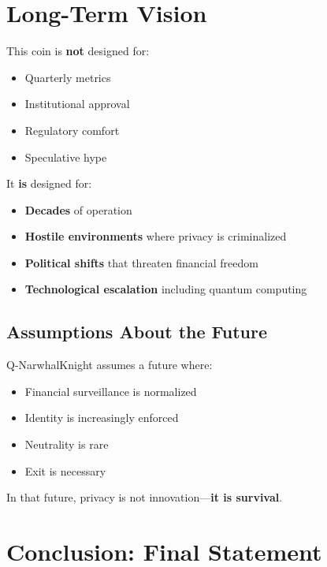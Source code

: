 \documentclass[12pt,a4paper]{article}
\begin{document}
\section{Long-Term Vision}

This coin is \textbf{not} designed for:
\begin{itemize}
    \item Quarterly metrics
    \item Institutional approval
    \item Regulatory comfort
    \item Speculative hype
\end{itemize}

It \textbf{is} designed for:
\begin{itemize}
    \item \textbf{Decades} of operation
    \item \textbf{Hostile environments} where privacy is criminalized
    \item \textbf{Political shifts} that threaten financial freedom
    \item \textbf{Technological escalation} including quantum computing
\end{itemize}

\subsection{Assumptions About the Future}

Q-NarwhalKnight assumes a future where:
\begin{itemize}
    \item Financial surveillance is normalized
    \item Identity is increasingly enforced
    \item Neutrality is rare
    \item Exit is necessary
\end{itemize}

In that future, privacy is not innovation---\textbf{it is survival}.

\section{Conclusion: Final Statement}
\end{document}
